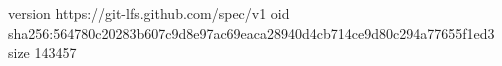 version https://git-lfs.github.com/spec/v1
oid sha256:564780c20283b607c9d8e97ac69eaca28940d4cb714ce9d80c294a77655f1ed3
size 143457
